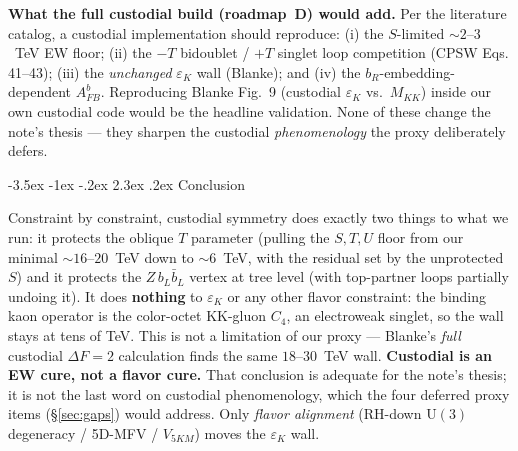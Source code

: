 \documentclass[11pt]{article}
\makeatletter
\providecommand{\FloatBarrier}{}
\renewcommand\section{\@startsection{section}{1}{\z@}%
  {-3.5ex \@plus -1ex \@minus -.2ex}%
  {2.3ex \@plus.2ex}%
  {\normalfont\Large\bfseries\color{accent}}}
\makeatother
\begin{document}
\textbf{What the full custodial build (roadmap~D) would add.} Per the literature
catalog, a custodial implementation should reproduce: (i) the $S$-limited
${\sim}2$--$3$~TeV EW floor; (ii) the $-T$ bidoublet / $+T$ singlet loop
competition (CPSW Eqs.\,41--43); (iii) the \emph{unchanged} $\varepsilon_K$ wall
(Blanke); and (iv) the $b_R$-embedding-dependent $A_{FB}^b$. Reproducing Blanke
Fig.~9 (custodial $\varepsilon_K$ vs.\ $M_{KK}$) inside our own custodial code
would be the headline validation. None of these change the note's thesis --- they
sharpen the custodial \emph{phenomenology} the proxy deliberately defers.

\FloatBarrier

\section{Conclusion}

Constraint by constraint, custodial symmetry does exactly two things to what we
run: it protects the oblique $T$ parameter (pulling the $S,T,U$ floor from our
minimal ${\sim}16$--$20$~TeV down to ${\sim}6$~TeV, with the residual set by the
unprotected $S$) and it protects the $Z\,b_L\bar b_L$ vertex at tree level (with
top-partner loops partially undoing it). It does \textbf{nothing} to
$\varepsilon_K$ or any other flavor constraint: the binding kaon operator is the
color-octet KK-gluon $C_4$, an electroweak singlet, so the wall stays at tens of
TeV. This is not a limitation of our proxy --- Blanke's \emph{full} custodial
$\Delta F=2$ calculation finds the same $18$--$30$~TeV wall. \textbf{Custodial is
an EW cure, not a flavor cure.} That conclusion is adequate for the note's thesis;
it is not the last word on custodial phenomenology, which the four deferred proxy
items (\S\ref{sec:gaps}) would address. Only \emph{flavor alignment} (RH-down
$\mathrm{U}(3)$ degeneracy / 5D-MFV / $V_{5KM}$) moves the $\varepsilon_K$ wall.
\end{document}
